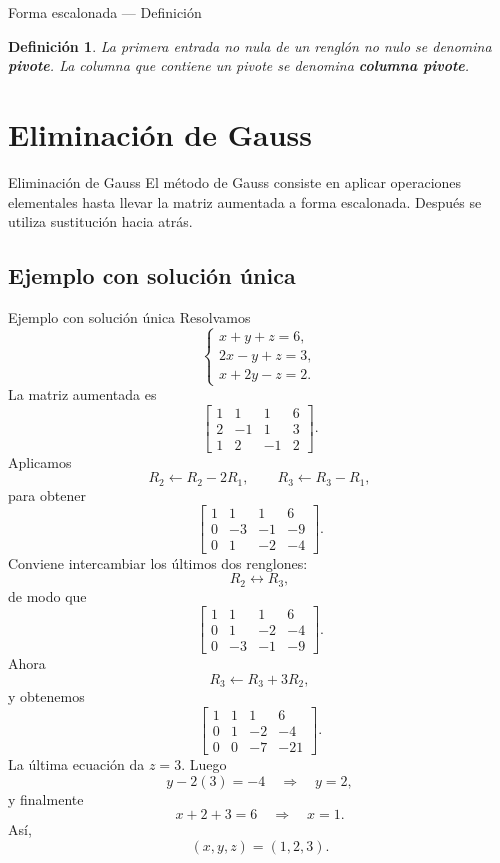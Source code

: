 \documentclass[aspectratio=169,11pt]{beamer}
\newtheorem{definicion}{Definición}[section]
\theoremstyle{remark}
\begin{document}
\begin{frame}[shrink=5]{Forma escalonada — Definición}
\footnotesize
\begin{definicion}
La primera entrada no nula de un renglón no nulo se denomina \textbf{pivote}. La columna que contiene
un pivote se denomina \textbf{columna pivote}.
\end{definicion}
\end{frame}

\section{Eliminación de Gauss}
\begin{frame}[allowframebreaks]{Eliminación de Gauss}
\footnotesize
El método de Gauss consiste en aplicar operaciones elementales hasta llevar la matriz aumentada a forma escalonada. Después se utiliza sustitución hacia atrás.
\end{frame}

\subsection*{Ejemplo con solución única}
\begin{frame}[allowframebreaks]{Ejemplo con solución única}
\footnotesize
Resolvamos
\[
\begin{cases}
x+y+z=6,\\
2x-y+z=3,\\
x+2y-z=2.
\end{cases}
\]
La matriz aumentada es
\[
\left[
\begin{array}{ccc|c}
1&1&1&6\\
2&-1&1&3\\
1&2&-1&2
\end{array}
\right].
\]
Aplicamos
\[
R_2\leftarrow R_2-2R_1,\qquad
R_3\leftarrow R_3-R_1,
\]
para obtener
\[
\left[
\begin{array}{ccc|c}
1&1&1&6\\
0&-3&-1&-9\\
0&1&-2&-4
\end{array}
\right].
\]
Conviene intercambiar los últimos dos renglones:
\[
R_2\leftrightarrow R_3,
\]
de modo que
\[
\left[
\begin{array}{ccc|c}
1&1&1&6\\
0&1&-2&-4\\
0&-3&-1&-9
\end{array}
\right].
\]
Ahora
\[
R_3\leftarrow R_3+3R_2,
\]
y obtenemos
\[
\left[
\begin{array}{ccc|c}
1&1&1&6\\
0&1&-2&-4\\
0&0&-7&-21
\end{array}
\right].
\]
La última ecuación da $z=3$. Luego
\[
y-2(3)=-4\quad\Longrightarrow\quad y=2,
\]
y finalmente
\[
x+2+3=6\quad\Longrightarrow\quad x=1.
\]
Así,
\[
\boxed{(x,y,z)=(1,2,3)}.
\]
\end{frame}
\end{document}

